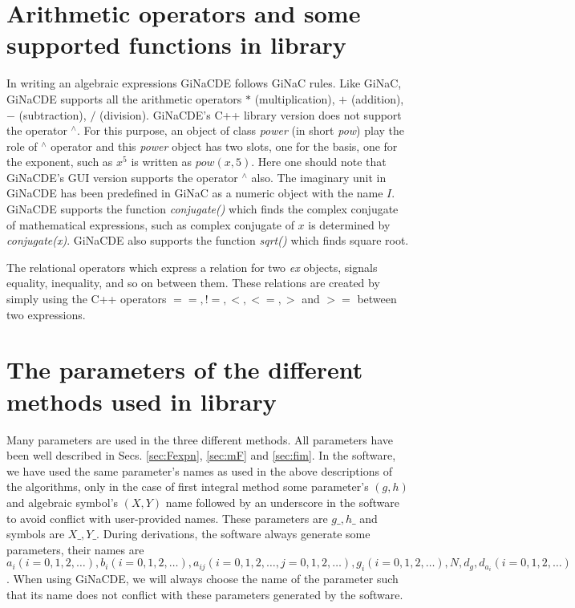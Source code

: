 \documentclass[prd,aps,floats,showkeys,nofootinbib,notitlepage]{revtex4-2}
\begin{document}
	\section{Arithmetic operators and some supported functions in library}
	In writing an algebraic expressions GiNaCDE follows GiNaC rules. Like GiNaC, GiNaCDE supports all the arithmetic operators $*$ (multiplication), $+$ (addition), $-$ (subtraction), $/$ (division). GiNaCDE's C++ library version does not support the operator $ ^{\wedge}$. For this purpose, an object of class {\em power} (in short {\em pow}) play the role of $ ^{\wedge}$ operator and this {\em power} object has two slots, one for the basis, one for the exponent, such as $x^5$ is written as $pow(x,5)$. Here one should note that GiNaCDE's GUI version supports the operator $ ^{\wedge}$ also.
	The imaginary unit in GiNaCDE has been predefined in GiNaC as a numeric object with the name $I$. GiNaCDE supports the function {\em conjugate()} which finds the complex conjugate of mathematical expressions, such as complex conjugate of $x$ is determined by {\em conjugate(x)}. GiNaCDE also supports the function {\em sqrt()} which finds square root.  
	\par The relational operators which express a relation for two {\em ex} objects, signals equality, inequality, and so on between them. These relations are created by simply using the C++ operators $==, !=, <, <=, >$ and $>=$ between two expressions. 
	
	\section{The parameters of the different methods used in library}
	Many parameters are used in the three different methods. All parameters have been well described in Secs. \ref{sec:Fexpn}, \ref{sec:mF} and \ref{sec:fim}. In the software, we have used the same parameter's names as used in the above descriptions of the algorithms, only in the case of first integral method some parameter's $(g,h)$ and algebraic symbol's $(X,Y)$ name followed by an underscore in the software to avoid conflict with user-provided names. These parameters are $g\_,h\_$ and symbols are $X\_,Y\_$. During derivations, the software always generate some parameters, their names are $a_i(i=0,1,2,\ldots),b_i(i=0,1,2,\ldots),a_{ij}(i=0,1,2,\ldots,j=0,1,2,\ldots),g_i(i=0,1,2,\ldots),N,d_g,d_{a_i}(i=0,1,2,\ldots)$. When using GiNaCDE, we will always choose the name of the parameter such that its name does not conflict with these parameters generated by the software.
	
\end{document}
